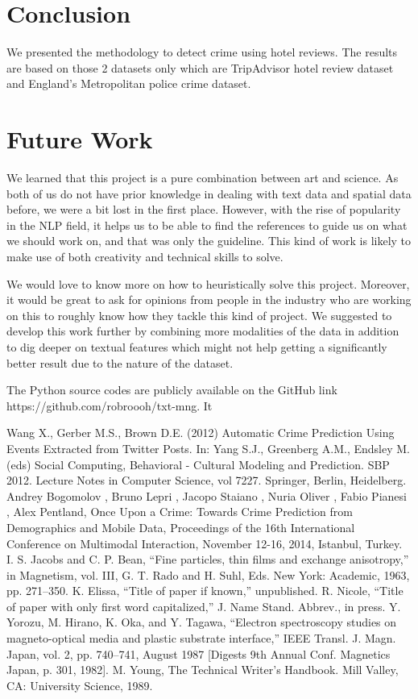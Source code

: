 \documentclass[conference]{IEEEtran}
\begin{document}
\section{Conclusion}
We presented the methodology to detect crime using hotel reviews. The results are based on those 2 datasets only which are TripAdvisor hotel review dataset and England's Metropolitan police crime dataset.
\section{Future Work}
We learned that this project is a pure combination between art and science. As both of us do not have prior knowledge in dealing with text data and spatial data before, we were a bit lost in the first place. However, with the rise of popularity in the NLP field, it helps us to be able to find the references to guide us on what we should work on, and that was only the guideline. This kind of work is likely to make use of both creativity and technical skills to solve.

We would love to know more on how to heuristically solve this project. Moreover, it would be great to ask for opinions from people in the industry who are working on this to roughly know how they tackle this kind of project. We suggested to develop this work further by combining more modalities of the data in addition to dig deeper on textual features which might not help getting a significantly better result due to the nature of the dataset.

The Python source codes are publicly available on the GitHub link https://github.com/robroooh/txt-mng. It


\begin{thebibliography}{00}
 Wang X., Gerber M.S., Brown D.E. (2012) Automatic Crime Prediction Using Events Extracted from Twitter Posts. In: Yang S.J., Greenberg A.M., Endsley M. (eds) Social Computing, Behavioral - Cultural Modeling and Prediction. SBP 2012. Lecture Notes in Computer Science, vol 7227. Springer, Berlin, Heidelberg.
 Andrey Bogomolov , Bruno Lepri , Jacopo Staiano , Nuria Oliver , Fabio Pianesi , Alex Pentland, Once Upon a Crime: Towards Crime Prediction from Demographics and Mobile Data, Proceedings of the 16th International Conference on Multimodal Interaction, November 12-16, 2014, Istanbul, Turkey.
 I. S. Jacobs and C. P. Bean, ``Fine particles, thin films and exchange anisotropy,'' in Magnetism, vol. III, G. T. Rado and H. Suhl, Eds. New York: Academic, 1963, pp. 271--350.
 K. Elissa, ``Title of paper if known,'' unpublished.
 R. Nicole, ``Title of paper with only first word capitalized,'' J. Name Stand. Abbrev., in press.
 Y. Yorozu, M. Hirano, K. Oka, and Y. Tagawa, ``Electron spectroscopy studies on magneto-optical media and plastic substrate interface,'' IEEE Transl. J. Magn. Japan, vol. 2, pp. 740--741, August 1987 [Digests 9th Annual Conf. Magnetics Japan, p. 301, 1982].
 M. Young, The Technical Writer's Handbook. Mill Valley, CA: University Science, 1989.
\end{thebibliography}
\end{document}
